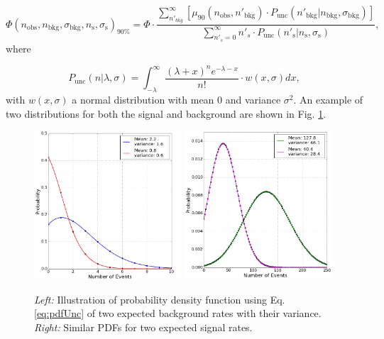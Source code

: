 \begin{equation}
\label{eq:finalUL}
\Phi(n_\textrm{obs}, n_\textrm{bkg}, \sigma_{\textrm{bkg}}, n_\textrm{s}, \sigma_{\textrm{s}} )_{90\%} = \Phi \cdot \frac{\sum^\infty_{n'_{bkg}} \left[ \mu_{90}\left(n_\textrm{obs},n'_\textrm{bkg} \right) \cdot P_\textrm{unc} \left(n'_\textrm{bkg}|n_\textrm{bkg},\sigma_{\textrm{bkg}}\right) \right]}{\sum^\infty_{n'_s = 0} n'_s \cdot P_\textrm{unc}\left(n'_\textrm{s} | n_\textrm{s}, \sigma_{\textrm{s}}\right)},
\end{equation}
where

\begin{equation}
\label{eq:pdfUnc}
P_\textrm{unc}\left(n|\lambda, \sigma \right) = \int^\infty_{-\lambda} \frac{\left(\lambda + x\right)^n e^{-\lambda-x}}{n!} \cdot w(x,\sigma)dx,
\end{equation}
with $w(x,\sigma)$ a normal distribution with mean 0 and variance $\sigma^2$. An example of two distributions for both the signal and background are shown in Fig. \ref{fig:pvuncertaintieswidth}.

\begin{figure}
\centering
\includegraphics[width=0.49\textwidth]{chapter8/img/PVuncertainty_asweights_background.png}
\includegraphics[width=0.49\textwidth]{chapter8/img/PVuncertainty_asweights_signal.png}
\caption{\textit{Left: }Illustration of probability density function using Eq. \ref{eq:pdfUnc} of two expected background rates with their variance. \textit{Right: }Similar PDFs for two expected signal rates.}
\label{fig:pvuncertaintieswidth}
\end{figure}


